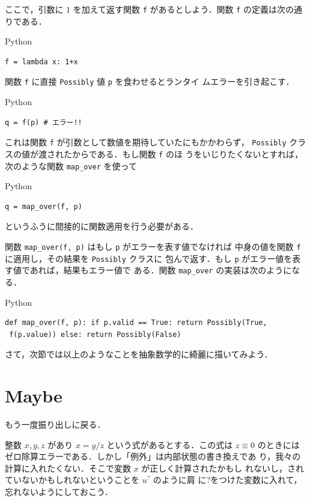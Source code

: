 \documentclass[a5paper,twoside,fleqn]{jsbook}
\newcommand{\programminglanguage}[1]{\textsf{#1}}
\newcommand{\python}{\programminglanguage{Python}}
\newcommand{\code}[1]{\texttt{#1}}
\newenvironment{pythoncode}{\begin{itembox}[r]{\python}}{\end{itembox}}
\newcommand{\mMaybe}[1]{{#1}^?}
\begin{document}
ここで，引数に $1$ を加えて返す関数 \code{f} があるとしよう．関数
\code{f} の定義は次の通りである．
\begin{pythoncode}
\begin{verbatim}
f = lambda x: 1+x
\end{verbatim}
\end{pythoncode}

関数 \code{f} に直接 \code{Possibly} 値 \code{p} を食わせるとランタイ
ムエラーを引き起こす．
\begin{pythoncode}
\begin{verbatim}
q = f(p) # エラー!!
\end{verbatim}
\end{pythoncode}
これは関数 \code{f} が引数として数値を期待していたにもかかわらず，
\code{Possibly} クラスの値が渡されたからである．もし関数 \code{f} のほ
うをいじりたくないとすれば，次のような関数 \code{map\_over} を使って
\begin{pythoncode}
\begin{verbatim}
q = map_over(f, p)
\end{verbatim}
\end{pythoncode}
というふうに間接的に関数適用を行う必要がある．

関数 \code{map\_over(f, p)} はもし \code{p} がエラーを表す値でなければ
中身の値を関数 \code{f} に適用し，その結果を \code{Possibly} クラスに
包んで返す．もし \code{p} がエラー値を表す値であれば，結果もエラー値で
ある．関数 \code{map\_over} の実装は次のようになる．
\begin{pythoncode}
\begin{verbatim}
def map_over(f, p): if p.valid == True: return Possibly(True,
 f(p.value)) else: return Possibly(False)
\end{verbatim}
\end{pythoncode}

さて，次節では以上のようなことを抽象数学的に綺麗に描いてみよう．

\section{Maybe}

もう一度振り出しに戻る．

整数 $x,y,z$ があり $x=y/z$ という式があるとする．この式は $z\equiv0$
のときにはゼロ除算エラーである．しかし「例外」は内部状態の書き換えであ
り，我々の計算に入れたくない．そこで変数 $x$ が正しく計算されたかもし
れないし，されていないかもしれないということを $\mMaybe{u}$ のように肩
に?をつけた変数に入れて，忘れないようにしておこう．
\end{document}

